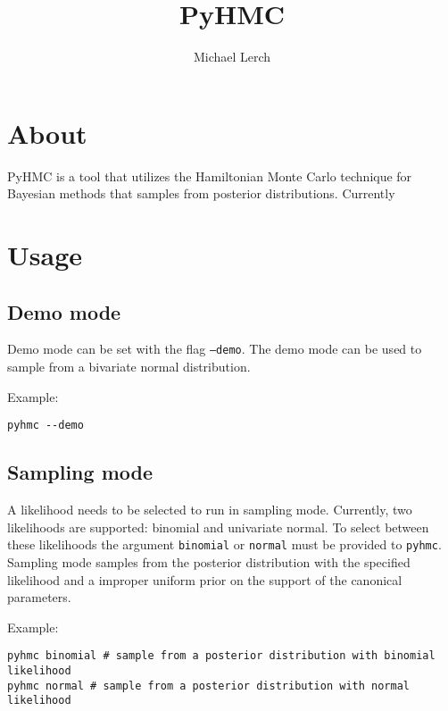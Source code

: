 \documentclass[10pt,letterpaper]{article}
\author{Michael Lerch}
\title{PyHMC}
\date{}
\begin{document}
\maketitle

\section{About}
\label{sec:about}

PyHMC is a tool that utilizes the Hamiltonian Monte Carlo technique for
Bayesian methods that samples from posterior distributions.  Currently


\section{Usage}
\label{sec:usage}

\subsection{Demo mode}
\label{sub:demo_mode}

Demo mode can be set with the flag \texttt{--demo}.  The demo mode can be used
to sample from a bivariate normal distribution.

Example:

\begin{verbatim}
pyhmc --demo
\end{verbatim}


\subsection{Sampling mode}
\label{sub:sampling_mode}

A likelihood needs to be selected to run in sampling mode.  Currently, two
likelihoods are supported: binomial and univariate normal.  To select between
these likelihoods the argument \texttt{binomial} or \texttt{normal} must be
provided to \texttt{pyhmc}.  Sampling mode samples from the posterior
distribution with the specified likelihood and a improper uniform prior on the
support of the canonical parameters.

Example:

\begin{verbatim}
pyhmc binomial # sample from a posterior distribution with binomial likelihood
pyhmc normal # sample from a posterior distribution with normal likelihood
\end{verbatim}
\end{document}
